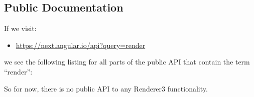 \subsection{Public Documentation}

If we visit:

\begin{itemize}
  \item \url{https://next.angular.io/api?query=render}
\end{itemize}

we see the following listing for all parts of the public API that contain the term
“render”:

So for now, there is no public API to any Renderer3 functionality.

